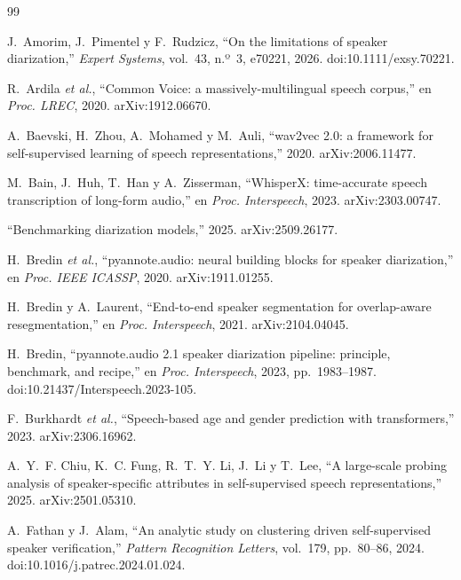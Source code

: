 \documentclass[11pt,a4paper]{article}
\begin{document}
\begin{thebibliography}{99}

 J.~Amorim, J.~Pimentel y F.~Rudzicz, ``On the limitations of speaker diarization,'' \emph{Expert Systems}, vol.~43, n.º~3, e70221, 2026. doi:10.1111/exsy.70221.

 R.~Ardila \emph{et al.}, ``Common Voice: a massively-multilingual speech corpus,'' en \emph{Proc. LREC}, 2020. arXiv:1912.06670.

 A.~Baevski, H.~Zhou, A.~Mohamed y M.~Auli, ``wav2vec 2.0: a framework for self-supervised learning of speech representations,'' 2020. arXiv:2006.11477.

 M.~Bain, J.~Huh, T.~Han y A.~Zisserman, ``WhisperX: time-accurate speech transcription of long-form audio,'' en \emph{Proc. Interspeech}, 2023. arXiv:2303.00747.

 ``Benchmarking diarization models,'' 2025. arXiv:2509.26177.

 H.~Bredin \emph{et al.}, ``pyannote.audio: neural building blocks for speaker diarization,'' en \emph{Proc. IEEE ICASSP}, 2020. arXiv:1911.01255.

 H.~Bredin y A.~Laurent, ``End-to-end speaker segmentation for overlap-aware resegmentation,'' en \emph{Proc. Interspeech}, 2021. arXiv:2104.04045.

 H.~Bredin, ``pyannote.audio 2.1 speaker diarization pipeline: principle, benchmark, and recipe,'' en \emph{Proc. Interspeech}, 2023, pp.~1983--1987. doi:10.21437/Interspeech.2023-105.

 F.~Burkhardt \emph{et al.}, ``Speech-based age and gender prediction with transformers,'' 2023. arXiv:2306.16962.

 A.~Y.~F. Chiu, K.~C. Fung, R.~T.~Y. Li, J.~Li y T.~Lee, ``A large-scale probing analysis of speaker-specific attributes in self-supervised speech representations,'' 2025. arXiv:2501.05310.

 A.~Fathan y J.~Alam, ``An analytic study on clustering driven self-supervised speaker verification,'' \emph{Pattern Recognition Letters}, vol.~179, pp.~80--86, 2024. doi:10.1016/j.patrec.2024.01.024.


\end{thebibliography}
\end{document}
